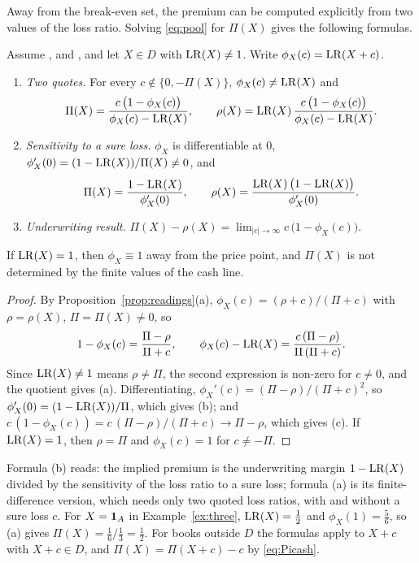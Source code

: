 Away from the break-even set, the premium can be computed explicitly from two values of the loss ratio. Solving
\eqref{eq:pool} for $\Pi(X)$ gives the following formulas.

\begin{proposition}\label{prop:explicit}
Assume \axP, \axN{} and \axCM, and let $X\in D$ with $\mathrm{LR}(X)\ne1$. Write $\phi_X(c)=\mathrm{LR}(X+c)$.
\begin{enumerate}[label=(\alph*),nosep]
\item \emph{Two quotes.} For every $c\notin\{0,-\Pi(X)\}$, $\phi_X(c)\ne\mathrm{LR}(X)$ and
  \[
   \Pi(X)=\frac{c\,\bigl(1-\phi_X(c)\bigr)}{\phi_X(c)-\mathrm{LR}(X)},\qquad
   \rho(X)=\mathrm{LR}(X)\,\frac{c\,\bigl(1-\phi_X(c)\bigr)}{\phi_X(c)-\mathrm{LR}(X)} .
  \]
\item \emph{Sensitivity to a sure loss.} $\phi_X$ is differentiable at $0$, $\phi_X'(0)=(1-\mathrm{LR}(X))/\Pi(X)\ne0$, and
  \[
   \Pi(X)=\frac{1-\mathrm{LR}(X)}{\phi_X'(0)},\qquad \rho(X)=\frac{\mathrm{LR}(X)\,\bigl(1-\mathrm{LR}(X)\bigr)}{\phi_X'(0)} .
  \]
\item \emph{Underwriting result.} $\Pi(X)-\rho(X)=\lim_{|c|\to\infty}c\,\bigl(1-\phi_X(c)\bigr)$.
\end{enumerate}
If $\mathrm{LR}(X)=1$, then $\phi_X\equiv1$ away from the price point, and $\Pi(X)$ is not determined by the finite values
of the cash line.
\end{proposition}

\begin{proof}
By Proposition~\ref{prop:readings}(a), $\phi_X(c)=(\rho+c)/(\Pi+c)$ with $\rho=\rho(X)$, $\Pi=\Pi(X)\ne0$, so
\[
 1-\phi_X(c)=\frac{\Pi-\rho}{\Pi+c},\qquad \phi_X(c)-\mathrm{LR}(X)=\frac{c\,(\Pi-\rho)}{\Pi\,(\Pi+c)} .
\]
Since $\mathrm{LR}(X)\ne1$ means $\rho\ne\Pi$, the second expression is non-zero for $c\ne0$, and the quotient gives (a).
Differentiating, $\phi_X'(c)=(\Pi-\rho)/(\Pi+c)^2$, so $\phi_X'(0)=(1-\mathrm{LR}(X))/\Pi$, which gives (b); and
$c\,(1-\phi_X(c))=c\,(\Pi-\rho)/(\Pi+c)\to\Pi-\rho$, which gives (c). If $\mathrm{LR}(X)=1$, then $\rho=\Pi$ and
$\phi_X(c)=1$ for $c\ne-\Pi$. \qedhere
\end{proof}

Formula (b) reads: the implied premium is the underwriting margin $1-\mathrm{LR}(X)$ divided by the sensitivity of the
loss ratio to a sure loss; formula (a) is its finite-difference version, which needs only two quoted loss ratios,
with and without a sure loss $c$. For $X=\mathbf 1_A$ in Example~\ref{ex:three}, $\mathrm{LR}(X)=\tfrac12$ and
$\phi_X(1)=\tfrac56$, so (a) gives $\Pi(X)=\tfrac16/\tfrac13=\tfrac12$. For books outside $D$ the formulas apply to
$X+c$ with $X+c\in D$, and $\Pi(X)=\Pi(X+c)-c$ by \eqref{eq:Picash}.

